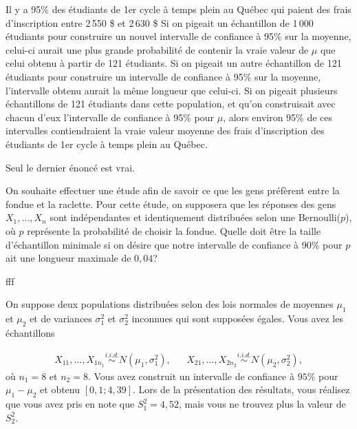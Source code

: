 \begin{questions}
\begin{checkboxes}
\choice Il y a 95\% des étudiants de 1er cycle à temps plein au Québec qui paient des frais d'inscription entre 2\,550 \$ et 2\,630 \$
\choice Si on pigeait un échantillon de 1\,000 étudiants pour construire un nouvel intervalle de confiance à 95\% sur la moyenne, celui-ci aurait une plus grande probabilité de contenir la vraie valeur de $\mu$ que celui obtenu à partir de 121 étudiants.
\choice Si on pigeait un autre échantillon de 121 étudiants pour construire un intervalle de confiance à 95\% sur la moyenne, l'intervalle obtenu aurait la même longueur que celui-ci.
\choice Si on pigeait plusieurs échantillons de 121 étudiants dans cette population, et qu'on construisait avec chacun d'eux l'intervalle de confiance à 95\% pour $\mu$, alors environ 95\% de ces intervalles contiendraient la vraie valeur moyenne des frais d'inscription des étudiants de 1er cycle à temps plein au Québec. 
\end{checkboxes}


\begin{solution}
Seul le dernier énoncé est vrai. 
\end{solution}

\newpage
\question[8]
On souhaite effectuer une étude afin de savoir ce que les gens préfèrent entre la fondue et la raclette. Pour cette étude, on supposera que les réponses des gens $X_1,\hdots,X_n$ sont indépendantes et identiquement distribuées selon une Bernoulli($p$), où $p$ représente la probabilité de choisir la fondue. Quelle doit être la taille d'échantillon minimale si on désire que notre intervalle de confiance à 90\% pour $p$ ait une longueur maximale de $0,04$?
\begin{solution}
    fff
\end{solution}


\newpage

\question
On suppose deux populations distribuées selon des lois normales de moyennes $\mu_1$ et $\mu_2$ et de variances $\sigma^2_1$ et $\sigma^2_2$ inconnues qui sont supposées égales. Vous avez les échantillons

\begin{align*}
X_{11}, \ldots, X_{1n_1} \overset{i.i.d.}{\sim} N(\mu_1, \sigma^2_1), & & X_{21}, \ldots, X_{2n_2} \overset{i.i.d.}{\sim} N(\mu_2, \sigma^2_2),
\end{align*}
où $n_1=8$ et $n_2=8$. Vous avez construit un intervalle de confiance à $95\%$ pour $\mu_1-\mu_2$ et obtenu $[0,1; 4,39]$. Lors de la présentation des résultats, vous réalisez que vous avez pris en note que $S^2_1=4,52$, mais vous ne trouvez plus la valeur de $S^2_2$. 
\begin{parts}

\end{parts}
\end{questions}
